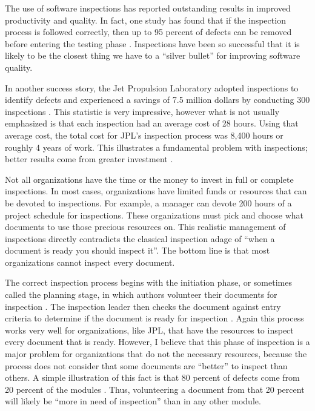 \documentclass[11pt,twocolumn]{article}
\begin{document}
\label{sec:intro}
The use of software inspections has reported outstanding results in
improved productivity and quality. In fact, one study has found that if the
inspection process is followed correctly, then up to 95 percent of defects
can be removed before entering the testing phase \cite{Bush90}.
Inspections have been so successful that it is likely to be the closest
thing we have to a ``silver bullet'' for improving software quality.


In another success story, the Jet Propulsion Laboratory adopted inspections
to identify defects and experienced a savings of 7.5 million dollars by
conducting 300 inspections \cite{Bush90a}. This statistic is very
impressive, however what is not usually emphasized is that each inspection
had an average cost of 28 hours. Using that average cost, the total cost
for JPL's inspection process was 8,400 hours or roughly 4 years of work.
This illustrates a fundamental problem with inspections; better results
come from greater investment \cite{Gilb93}.

Not all organizations have the time or the money to invest in full or
complete inspections. In most cases, organizations have limited funds or
resources that can be devoted to inspections. For example, a manager can
devote 200 hours of a project schedule for inspections. These organizations
must pick and choose what documents to use those precious resources on.
This realistic management of inspections directly contradicts the classical
inspection adage of ``when a document is ready you should inspect it''. The
bottom line is that most organizations cannot inspect every document.

The correct inspection process begins with the initiation phase, or
sometimes called the planning stage, in which authors volunteer their
documents for inspection \cite {Gilb93}. The inspection leader then checks
the document against entry criteria to determine if the document is ready
for inspection \cite{Ebenau94} \cite{Gilb93}. Again this process works very
well for organizations, like JPL, that have the resources to inspect every
document that is ready. However, I believe that this phase of inspection is
a major problem for organizations that do not the necessary resources,
because the process does not consider that some documents are ``better'' to
inspect than others. A simple illustration of this fact is that 80 percent
of defects come from 20 percent of the modules \cite{Boehm01}.  Thus,
volunteering a document from that 20 percent will likely be ``more in need
of inspection'' than in any other module.
\end{document}
